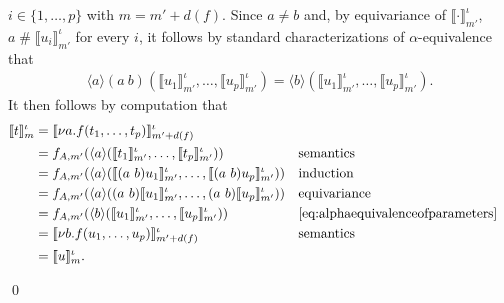 \documentclass[a4paper,UKenglish,cleveref,thm-restate,numberwithinsect,final]{lipics-v2021}
\newcommand{\fresh}{\mathbin{\#}}
\theoremstyle{plain}
\numberwithin{equation}{section}
\newcommand{\+}[1]{\mathcal{#1}\xspace}
\theoremstyle{definition}
\begin{document}
\begin{itemize}
            \(i \in \{1, \ldots, p\}\) with \(m = m' + d(f)\).  Since
            \(a \neq b\) and, by equivariance of
            \(\llbracket \cdot \rrbracket^\iota_{m'}\),
            \(a \fresh \llbracket u_i \rrbracket^\iota_{m'}\) for every
            \(i\), it follows by standard characterizations of
            $\alpha$-equivalence~\cite{Pitts13} that
            \begin{gather}
                \langle a \rangle (a\ b)(\llbracket u_1 \rrbracket^\iota_{m'}, \ldots, \llbracket u_p \rrbracket^\iota_{m'}) = \langle b \rangle (\llbracket u_1 \rrbracket^\iota_{m'}, \ldots, \llbracket u_p \rrbracket^\iota_{m'}). \label{eq:alphaequivalenceofparameters}
            \end{gather}
            It then follows by computation that
            \begin{align*}
              \llbracket t \rrbracket^\iota_m
              &= \llbracket \nu a.f(t_1, \ldots, t_p) \rrbracket^\iota_{m' + d(f)} \\
              &= f_{A, m'}(\langle a \rangle (\llbracket t_1 \rrbracket^\iota_{m'}, \ldots, \llbracket t_p \rrbracket^\iota_{m'})) && \text{semantics} \\
              &= f_{A, m'}(\langle a \rangle (\llbracket (a\ b)u_1 \rrbracket^\iota_{m'}, \ldots, \llbracket (a\ b)u_p \rrbracket^\iota_{m'})) && \text{induction} \\
              &= f_{A, m'}(\langle a \rangle ((a\ b)\llbracket u_1 \rrbracket^\iota_{m'}, \ldots, (a\ b)\llbracket u_p \rrbracket^\iota_{m'})) && \text{equivariance} \\
              &= f_{A, m'}(\langle b \rangle (\llbracket u_1 \rrbracket^\iota_{m'}, \ldots, \llbracket u_p \rrbracket^\iota_{m'})) && \text{\cref{eq:alphaequivalenceofparameters}} \\
              &= \llbracket \nu b.f(u_1, \ldots, u_p) \rrbracket^\iota_{m' + d(f)} && \text{semantics} \\
              &= \llbracket u \rrbracket^\iota_m.
            \end{align*}
          \end{itemize}
\qed
\end{document}
